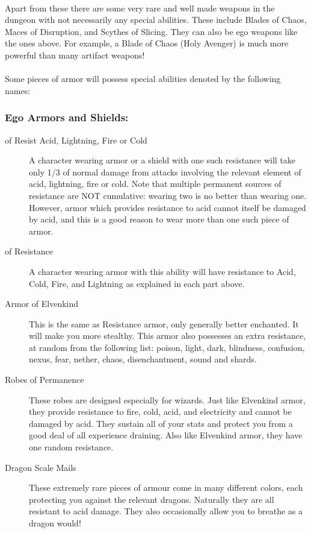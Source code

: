 \paragraph{}
Apart from these there are some very rare and well made weapons in the
dungeon with not necessarily any special abilities. These include Blades
of Chaos, Maces of Disruption, and Scythes of Slicing. They can also be
ego weapons like the ones above. For example, a Blade of Chaos (Holy
Avenger) is much more powerful than many artifact weapons!

\paragraph{}
Some pieces of armor will possess special abilities denoted by the following
names:

\subsubsection{Ego Armors and Shields:}
\begin{description}
\item[of Resist Acid, Lightning, Fire or Cold]
     A character wearing armor or a shield with one such resistance will
     take only 1/3 of normal damage from attacks involving the relevant
     element of acid, lightning, fire or cold. Note that multiple
     permanent sources of resistance are NOT cumulative: wearing two is
     no better than wearing one. However, armor which provides resistance
     to acid cannot itself be damaged by acid, and this is a good reason
     to wear more than one such piece of armor.
 
\item[of Resistance]
     A character wearing armor with this ability will have resistance to
     Acid, Cold, Fire, and Lightning as explained in each part above.

\item[Armor of Elvenkind]
     This is the same as Resistance armor, only generally better enchanted.
     It will make you more stealthy. This armor also possesses an extra
     resistance, at random from the following list: poison, light, dark,
     blindness, confusion, nexus, fear, nether, chaos, disenchantment,
     sound and shards.
 
\item[Robes of Permanence]
     These robes are designed especially for wizards. Just like Elvenkind
     armor, they provide resistance to fire, cold, acid, and electricity and
     cannot be damaged by acid. They sustain all of your stats and protect
     you from a good deal of all experience draining. Also like Elvenkind
     armor, they have one random resistance.

\item[Dragon Scale Mails]
     These extremely rare pieces of armour come in many different colors,
     each protecting you against the relevant dragons. Naturally they are
     all resistant to acid damage. They also occasionally allow you to
     breathe as a dragon would!
\end{description}

